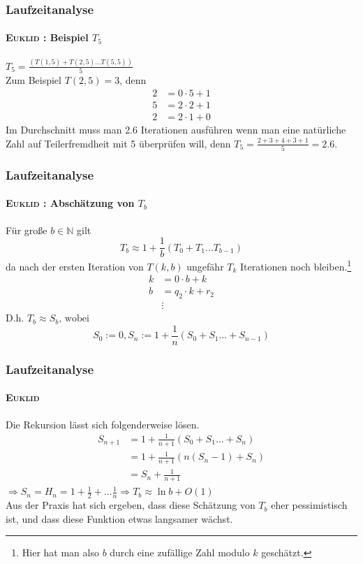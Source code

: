 \documentclass[•]{beamer}
\begin{document}
\begin{frame}	
		\frametitle{Laufzeitanalyse}
	\framesubtitle{\textsc{Euklid} : Beispiel $T_5$}
	
	$T_5 = \frac{(T(1,5) + T(2,5) \dots T(5,5))}{5}$\\
	Zum Beispiel $T(2,5) = 3$, denn
	\setcounter{equation}{0}
	\begin{align}
	2&=0\cdot 5 + 1	\\
	5&=2\cdot 2 + 1 \\
	2&= 2\cdot 1+0
	\end{align}
		Im Durchschnitt muss man 2.6 Iterationen ausf\"uhren wenn man eine nat\"urliche Zahl auf Teilerfremdheit mit 5 \"uberpr\"ufen will, denn $T_5 = \frac{2+3+4+3+1}{5} = 2.6$.
	\end{frame}

	\begin{frame}	
		\frametitle{Laufzeitanalyse}
	\framesubtitle{\textsc{Euklid} : Absch\"atzung von $T_b$}
	F\"ur gro{\ss}e $b \in \mathbb{N}$ gilt
	$$T_b \approx 1 + \frac{1}{b} (T_0 + T_1 \dots T_{b-1})$$ da nach der ersten Iteration von $T(k,b)$ ungef\"ahr $T_{k}$ Iterationen noch bleiben.\footnote{\scriptsize{Hier hat man also $b$ durch eine zuf\"allige Zahl modulo $k$ gesch\"atzt.}}\\
	\begin{align*}
	k&=0\cdot b + k\\
	b&=q_{2}\cdot k + r_2\\
	&\vdots
\end{align*}		
	 $ \text{D.h. }T_b \approx S_b \text{, wobei }$ $$S_0 := 0, S_n := 1 + \frac{1}{n} (S_0 + S_1 \dots + S_{n-1})$$
\end{frame}		

\begin{frame}
\frametitle{Laufzeitanalyse}
	\framesubtitle{\textsc{Euklid}}
Die Rekursion l\"asst sich folgenderweise l\"osen.
	\begin{align*}
	S_{n+1} &= 1 + \frac{1}{n+1}(S_0 + S_1 \dots + S_n)\\
	&= 1 + \frac{1}{n+1}(n(S_n - 1) + S_n)\\
	&= S_n + \frac{1}{n+1}
	\end{align*}
	$\Rightarrow S_n = H_n = 1 + \frac{1}{2} + \dots \frac{1}{n} \Rightarrow T_b \approx \ln b + O(1)$ \\
	Aus der Praxis hat sich ergeben, dass diese Sch\"atzung von $T_b$ eher pessimistisch ist, und dass diese Funktion etwas langsamer w\"achst.
\end{frame}
	
\end{document}
